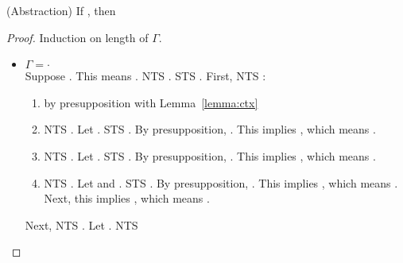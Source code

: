 \begin{lemma}\textnormal{(Abstraction)}
If , then 
\end{lemma}

\begin{proof}
Induction on length of $\Gamma$.
\begin{itemize}
    \item $\Gamma = \cdot$\\
    Suppose . This means
     .
     NTS . STS
     . First, NTS 
     :
     \begin{enumerate}
         \item {} by presupposition with Lemma~\ref{lemma:ctx}
         \item NTS . Let . STS 
         . By presupposition, . This implies
         , which means .
         \item NTS . Let . STS \isPot{[a/x]\varphi}. 
         By presupposition, .
         This implies \gammaToPot{\cdot}{[a/x]\varphi}, which means \isPot{[a/x]\varphi}.
         \item NTS . 
         Let  and . STS \isPot{[a/x,b/y]\varrho}. By presupposition, 
         . This implies 
         \gammaToPot{\cdot[\isOf{y}{[a/x]B}]}{[a/x]\varrho}, which means .
         Next, this implies \gammaToPot{\cdot}{[b/y][a/x]\varrho}, which means \isPot{[b/y][a/x]\varrho}. 
     \end{enumerate}
     Next, NTS .
     Let . NTS 
     \begin{enumerate}

\end{enumerate}
\end{itemize}
\end{proof}
